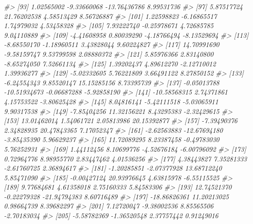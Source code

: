 \documentclass[
]{book}
\newenvironment{Shaded}{\begin{snugshade}}{\end{snugshade}}
\newcommand{\CommentTok}[1]{\textcolor[rgb]{0.56,0.35,0.01}{\textit{#1}}}
\begin{document}
\begin{Shaded}
\begin{Highlighting}[]
\CommentTok{\#\textgreater{}  [93]   1.02565002  {-}9.33660068 {-}13.76436786   8.99531736}
\CommentTok{\#\textgreater{}  [97]   5.87517724  21.76202538   4.58513429   8.56726887}
\CommentTok{\#\textgreater{} [101]   1.22598823  {-}6.16865517   1.74979032   4.53458328}
\CommentTok{\#\textgreater{} [105]   7.93222740  {-}0.25978671   4.72685785   9.04110889}
\CommentTok{\#\textgreater{} [109]  {-}4.41608958   0.80039290  {-}4.18766494  {-}8.13529694}
\CommentTok{\#\textgreater{} [113]  {-}8.68550170  {-}1.18960511   3.43828044   9.60224827}
\CommentTok{\#\textgreater{} [117]  14.70991690  {-}9.58159747   9.53799598   2.08880372}
\CommentTok{\#\textgreater{} [121]   5.85976366   2.83140800  {-}8.65274050   7.52661134}
\CommentTok{\#\textgreater{} [125]   1.39202437   4.89612270  {-}2.12710012   1.39936277}
\CommentTok{\#\textgreater{} [129]  {-}5.02332605   5.76221809   3.66491122   8.27850152}
\CommentTok{\#\textgreater{} [133]  {-}6.24554343   9.85520147  15.15285156   8.73395739}
\CommentTok{\#\textgreater{} [137]  {-}0.05013788 {-}10.51934673  {-}0.06687288  {-}5.92858190}
\CommentTok{\#\textgreater{} [141] {-}10.58568315   2.74371861   4.15753522  {-}3.80625428}
\CommentTok{\#\textgreater{} [145]   8.04816141  {-}5.42111518  {-}5.03065911   9.90317538}
\CommentTok{\#\textgreater{} [149]  {-}7.85404256  11.32156221   8.43295383  {-}2.32429615}
\CommentTok{\#\textgreater{} [153]  13.01462014   1.54061721   2.05813986  20.15392877}
\CommentTok{\#\textgreater{} [157]  {-}7.39490376   2.34828935  20.47843365   7.17052347}
\CommentTok{\#\textgreater{} [161]  {-}2.62563883 {-}12.67694180  {-}3.85435390   5.96629237}
\CommentTok{\#\textgreater{} [165]  11.72089295   8.23387458  {-}0.49783030   5.76252931}
\CommentTok{\#\textgreater{} [169]   1.44112456   8.10699776  {-}4.52676184  {-}6.00796092}
\CommentTok{\#\textgreater{} [173]   0.72964776   8.98955770   2.83447462   4.01536256}
\CommentTok{\#\textgreater{} [177]   4.38443827   7.35281333  {-}2.61760725   2.36894617}
\CommentTok{\#\textgreater{} [181]  {-}1.20285851  {-}2.07377928  13.68712240   5.85471090}
\CommentTok{\#\textgreater{} [185]  {-}0.00427124  20.93976645   4.63815978  {-}6.55115525}
\CommentTok{\#\textgreater{} [189]   9.77684681   4.61358018   2.75160333   5.84583306}
\CommentTok{\#\textgreater{} [193]  12.74521370  {-}0.22279328 {-}21.94794383   8.60716489}
\CommentTok{\#\textgreater{} [197] {-}18.86826361  11.20213025   0.98664739   8.39682297}
\CommentTok{\#\textgreater{} [201]   7.12720047  {-}9.38002536   8.85565506  {-}2.70183034}
\CommentTok{\#\textgreater{} [205]  {-}5.58782369  {-}1.36520548   2.37757442   0.91249016}

\end{Highlighting}
\end{Shaded}
\end{document}
